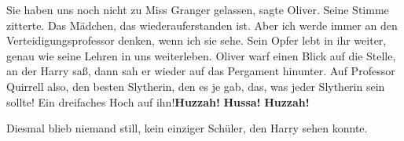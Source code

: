 \glqq{}Sie haben uns noch nicht zu Miss Granger gelassen\grqq{}, sagte Oliver.
Seine Stimme zitterte. \glqq{}Das Mädchen, das wiederauferstanden ist. Aber ich
werde immer an den Verteidigungsprofessor denken, wenn ich sie sehe. Sein Opfer
lebt in ihr weiter, genau wie seine Lehren in uns weiterleben.\grqq{} Oliver
warf einen Blick auf die Stelle, an der Harry saß, dann sah er wieder auf das
Pergament hinunter. \glqq{}Auf Professor Quirrell also, den besten Slytherin,
den es je gab, das, was jeder Slytherin sein sollte! Ein dreifaches Hoch auf
ihn!\grqq{}\textbf{\glqq{}Huzzah!} \textbf{Hussa!} \textbf{Huzzah!\grqq{}}

Diesmal blieb niemand still, kein einziger Schüler, den Harry sehen konnte.

